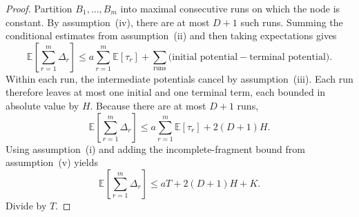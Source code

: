 \documentclass[12pt]{article}
\theoremstyle{definition}
\newcommand{\E}{\mathbb{E}}
\newcommand{\1}{\mathbf{1}}
\begin{document}
\begin{proof}
Partition $B_1,\dots,B_m$ into maximal consecutive runs on which the node is
constant. By assumption~(iv), there are at most $D+1$ such runs. Summing the
conditional estimates from assumption~(ii) and then taking expectations gives
\[
\E\left[\sum_{r=1}^m \Delta_r\right]
\le
a\sum_{r=1}^m \E[\tau_r]
+
\sum_{\text{runs}}
\bigl(\text{initial potential} - \text{terminal potential}\bigr).
\]
Within each run, the intermediate potentials cancel by assumption~(iii). Each run
therefore leaves at most one initial and one terminal term, each bounded in
absolute value by $H$. Because there are at most $D+1$ runs,
\[
\E\left[\sum_{r=1}^m \Delta_r\right]
\le
a\sum_{r=1}^m \E[\tau_r] + 2(D+1)H.
\]
Using assumption~(i) and adding the incomplete-fragment bound from assumption~(v)
yields
\[
\E\left[\sum_{r=1}^m \Delta_r\right]
\le
aT + 2(D+1)H + K.
\]
Divide by $T$.
\end{proof}
\end{document}
